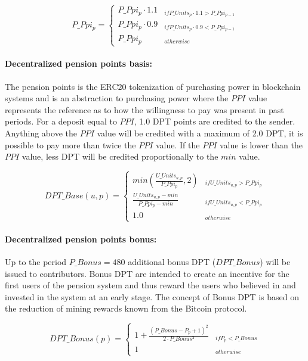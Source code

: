 \begin{equation}
P\_Ppi_{p} = \begin{cases} 
P\_Ppi_{p} \cdot 1.1 & _{if P\_Units_{p} \cdot 1.1 > P\_Ppi_{p-1}} \\
P\_Ppi_{p} \cdot 0.9 & _{if P\_Units_{p} \cdot 0.9 < P\_Ppi_{p-1}} \\
P\_Ppi_{p} & _{otherwise}
\end{cases}
\end{equation}

\paragraph*{Decentralized pension points basis:}
The pension points is the ERC20 tokenization of purchasing power in blockchain systems and is an abstraction to purchasing power where the $PPI$ value represents the reference as to how the willingness to pay was present in past periods. For a deposit equal to $PPI$, 1.0 DPT points are credited to the sender. Anything above the $PPI$ value will be credited with a maximum of 2.0 DPT, it is possible to pay more than twice the $PPI$ value. If the $PPI$ value is lower than the $PPI$ value, less DPT will be credited proportionally to the $min$ value.

\begin{dmath}
DPT\_Base(u, p) = \begin{cases} 
min(\frac{U\_Units_{u,p}} {P\_Ppi_{p}}, 2) 
  & _{if U\_Units_{u,p} > P\_Ppi_{p}} \\
\frac{U\_Units_{u,p} - min} {P\_Ppi_{p} - min} 
  & _{if U\_Units_{u,p} < P\_Ppi_{p}} \\
1.0 & _{otherwise}
\end{cases}
\end{dmath}

\paragraph*{Decentralized pension points bonus:}
Up to the period $P\_Bonus = 480$ additional bonus DPT ($DPT\_Bonus$) will be issued to contributors. Bonus DPT are intended to create an incentive for the first users of the pension system and thus reward the users who believed in and invested in the system at an early stage. The concept of Bonus DPT is based on the reduction of mining rewards known from the Bitcoin protocol.

\begin{equation}
DPT\_Bonus(p) = \begin{cases} 
1 + \frac{(P\_Bonus - P_{p} + 1)^2}
      {2 \cdot P\_Bonus^2} & _{if P_{p} < P\_Bonus} \\
1 & _{otherwise} 
\end{cases}
\end{equation}